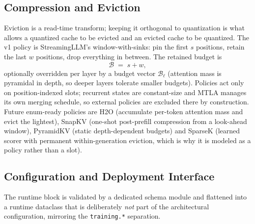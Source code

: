 \subsection{Compression and Eviction}
\label{sec:kv-evict}

Eviction is a read-time transform; keeping it orthogonal to quantization is what allows a quantized cache to be evicted and an evicted cache to be quantized. The v1 policy is StreamingLLM's window-with-sinks: pin the first $s$ positions, retain the last $w$ positions, drop everything in between. The retained budget is
\[
\mathcal{B} \;=\; s + w ,
\]
optionally overridden per layer by a budget vector $\mathcal{B}_\ell$ (attention mass is pyramidal in depth, so deeper layers tolerate smaller budgets). Policies act only on position-indexed slots; recurrent states are constant-size and MTLA manages its own merging schedule, so external policies are excluded there by construction. Future enum-ready policies are H2O (accumulate per-token attention mass and evict the lightest), SnapKV (one-shot post-prefill compression from a look-ahead window), PyramidKV (static depth-dependent budgets) and SparseK (learned scorer with permanent within-generation eviction, which is why it is modeled as a policy rather than a slot).

\subsection{Configuration and Deployment Interface}
\label{sec:kv-config}

The runtime block is validated by a dedicated schema module and flattened into a runtime dataclass that is deliberately \emph{not} part of the architectural configuration, mirroring the \texttt{training.*} separation.


